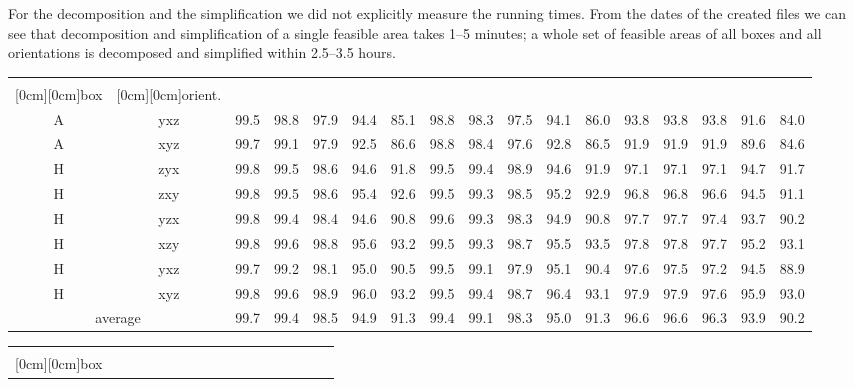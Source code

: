 \documentclass{article}
\begin{document}
For the decomposition and the simplification we did not explicitly
measure the running times. From the dates of the created files we can
see that decomposition and simplification of a single feasible area
takes 1--5 minutes; a whole set of feasible areas of all boxes and all
orientations is decomposed and simplified within 2.5--3.5 hours.

\begin{table}[t]
\center
\begin{tabular}{|cc|ccccc|ccccc|ccccc|}
\hline
& & \multicolumn{5}{|c|}{} & \multicolumn{5}{|c|}{} & \multicolumn{5}{|c|}{} \\
\raisebox{1.4ex}[0cm][0cm]{box} &
\raisebox{1.4ex}[0cm][0cm]{orient.} & 
 &  &  &  &  &  &  &  &  & 
&  &  &  &  &  \\
\hline
A & yxz & 99.5 & 98.8 & 97.9 & 94.4 & 85.1 & 98.8 & 98.3 & 97.5 & 94.1 & 86.0 & 93.8 & 93.8 & 93.8 & 91.6 & 84.0 \\
A & xyz & 99.7 & 99.1 & 97.9 & 92.5 & 86.6 & 98.8 & 98.4 & 97.6 & 92.8 & 86.5 & 91.9 & 91.9 & 91.9 & 89.6 & 84.6 \\
H & zyx & 99.8 & 99.5 & 98.6 & 94.6 & 91.8 & 99.5 & 99.4 & 98.9 & 94.6 & 91.9 & 97.1 & 97.1 & 97.1 & 94.7 & 91.7 \\
H & zxy & 99.8 & 99.5 & 98.6 & 95.4 & 92.6 & 99.5 & 99.3 & 98.5 & 95.2 & 92.9 & 96.8 & 96.8 & 96.6 & 94.5 & 91.1 \\
H & yzx & 99.8 & 99.4 & 98.4 & 94.6 & 90.8 & 99.6 & 99.3 & 98.3 & 94.9 & 90.8 & 97.7 & 97.7 & 97.4 & 93.7 & 90.2 \\
H & xzy & 99.8 & 99.6 & 98.8 & 95.6 & 93.2 & 99.5 & 99.3 & 98.7 & 95.5 & 93.5 & 97.8 & 97.8 & 97.7 & 95.2 & 93.1 \\
H & yxz & 99.7 & 99.2 & 98.1 & 95.0 & 90.5 & 99.5 & 99.1 & 97.9 & 95.1 & 90.4 & 97.6 & 97.5 & 97.2 & 94.5 & 88.9 \\
H & xyz & 99.8 & 99.6 & 98.9 & 96.0 & 93.2 & 99.5 & 99.4 & 98.7 & 96.4 & 93.1 & 97.9 & 97.9 & 97.6 & 95.9 & 93.0 \\
\hline
\multicolumn{2}{|c|}{average} 
& 99.7 & 99.4 & 98.5 & 94.9 & 91.3 
& 99.4 & 99.1 & 98.3 & 95.0 & 91.3 
& 96.6 & 96.6 & 96.3 & 93.9 & 90.2 \\
\hline
\end{tabular}
\vspace{3mm}
\begin{tabular}{|cc|ccccc|ccccc|ccccc|}
\hline
& & \multicolumn{5}{|c|}{} & \multicolumn{5}{|c|}{} & \multicolumn{5}{|c|}{} \\
\raisebox{1.4ex}[0cm][0cm]{box} &

\end{tabular}
\end{table}
\end{document}

